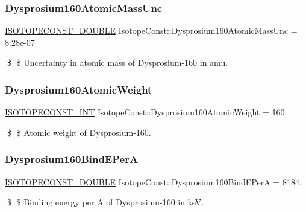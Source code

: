 \subsubsection{\texorpdfstring{Dysprosium160\+Atomic\+Mass\+Unc}{Dysprosium160AtomicMassUnc}}
{\footnotesize\ttfamily \mbox{\hyperlink{group___isotope_const-_macros_ga8f45a7272ce02c0b4c65c44636ed719a}{I\+S\+O\+T\+O\+P\+E\+C\+O\+N\+S\+T\+\_\+\+D\+O\+U\+B\+LE}} Isotope\+Const\+::\+Dysprosium160\+Atomic\+Mass\+Unc = 8.\+28e-\/07}

\$ \$ Uncertainty in atomic mass of Dysprosium-\/160 in amu. \mbox{\label{group___isotope_const-_dysprosium-_dy160_ga3d854bfb51dd190b17dd3555ffb50e90}} 
\subsubsection{\texorpdfstring{Dysprosium160\+Atomic\+Weight}{Dysprosium160AtomicWeight}}
{\footnotesize\ttfamily \mbox{\hyperlink{group___isotope_const-_macros_ga5f18360b3e99483a35c32d789e62621c}{I\+S\+O\+T\+O\+P\+E\+C\+O\+N\+S\+T\+\_\+\+I\+NT}} Isotope\+Const\+::\+Dysprosium160\+Atomic\+Weight = 160}

\$ \$ Atomic weight of Dysprosium-\/160. \mbox{\label{group___isotope_const-_dysprosium-_dy160_gac6ba8ec3e04b95963e863887819cd661}} 
\subsubsection{\texorpdfstring{Dysprosium160\+Bind\+E\+PerA}{Dysprosium160BindEPerA}}
{\footnotesize\ttfamily \mbox{\hyperlink{group___isotope_const-_macros_ga8f45a7272ce02c0b4c65c44636ed719a}{I\+S\+O\+T\+O\+P\+E\+C\+O\+N\+S\+T\+\_\+\+D\+O\+U\+B\+LE}} Isotope\+Const\+::\+Dysprosium160\+Bind\+E\+PerA = 8184.}

\$ \$ Binding energy per A of Dysprosium-\/160 in keV. \mbox{\label{group___isotope_const-_dysprosium-_dy160_gaa8e61be4e1499f42c1e5876c6f315f16}} 
